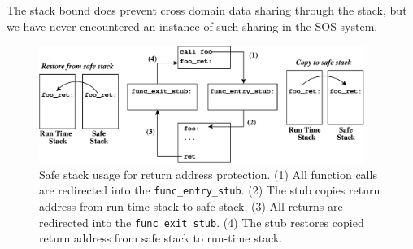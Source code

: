 The stack bound does prevent cross domain data sharing through the stack,
but we have never encountered an instance of such sharing
in the SOS system.
%


%
\begin{figure}[htbp]
   \centering
   \includegraphics[height=1.5in, keepaspectratio=true]{figures/safe_stack.eps} 
   \caption[Using safe stack for storing return address]{Safe stack
     usage for return address protection. (1) All function calls are redirected
     into the \texttt{func\_entry\_stub}. (2) The stub copies return
     address from run-time stack to safe stack. (3) All returns are
     redirected into the \texttt{func\_exit\_stub}. (4) The stub
     restores copied return address from safe stack to run-time stack.}
   \label{fig:safestack}
\end{figure}
%
